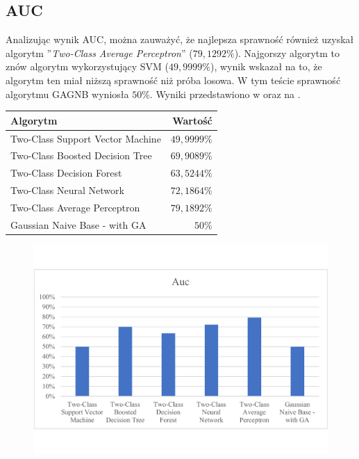 \subsection{AUC}
Analizując wynik AUC, można zauważyć, że najlepsza sprawność również uzyskał algorytm ''\textit{Two-Class Average Perceptron}'' ($79,1292\%$). Najgorszy algorytm to znów algorytm wykorzystujący SVM ($49,9999\%$), wynik wskazał na to, że algorytm ten miał niższą sprawność niż próba losowa. W tym teście sprawność algorytmu GAGNB wyniosła $50\%$. Wyniki przedstawiono w  oraz na .

\begin{table}[H]
    \centering
    \begin{tabular}{|l|r|} \hline
    \textbf{Algorytm} & \textbf{Wartość} \\ \hline
    Two-Class Support Vector Machine & $49,9999\%$ \\ \hline
    Two-Class Boosted Decision Tree & $69,9089\%$ \\ \hline
    Two-Class Decision Forest & $63,5244\%$ \\ \hline
    Two-Class Neural Network & $72,1864\%$ \\ \hline
    Two-Class Average Perceptron & $79,1892\%$ \\ \hline
    Gaussian Naive Base - with GA & $50\%$ \\ \hline
    \end{tabular}
    \label{tab:acc-auc}
\end{table}

\begin{figure}[H]
    \centering
    \includegraphics[width=\textwidth]{images/auc-res}
    \label{fig:auc-res}
\end{figure}


